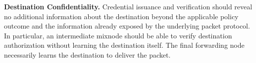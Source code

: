 \smallskip
\noindent\textbf{Destination Confidentiality.}
Credential issuance and verification should reveal no additional information about the destination beyond the applicable policy outcome and the information already exposed by the underlying packet protocol.
In particular, an intermediate mixnode should be able to verify destination authorization without learning the destination itself.
The final forwarding node necessarily learns the destination to deliver the packet.

